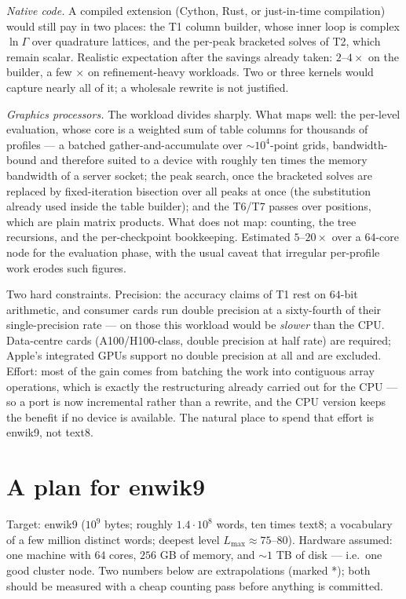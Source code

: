 \documentclass[11pt]{article}
\begin{document}
\emph{Native code.}  A compiled extension (Cython, Rust, or
just-in-time compilation) would still pay in two places: the T1
column builder, whose inner loop is complex $\ln\Gamma$ over
quadrature lattices, and the per-peak bracketed solves of T2, which
remain scalar.  Realistic expectation after the savings already
taken: $2$--$4\times$ on the builder, a few $\times$ on
refinement-heavy workloads.  Two or three kernels would capture
nearly all of it; a wholesale rewrite is not justified.

\emph{Graphics processors.}  The workload divides sharply.  What
maps well: the per-level evaluation, whose core is a weighted sum of
table columns for thousands of profiles --- a batched
gather-and-accumulate over $\sim\!10^4$-point grids, bandwidth-bound
and therefore suited to a device with roughly ten times the memory
bandwidth of a server socket; the peak search, once the bracketed
solves are replaced by fixed-iteration bisection over all peaks at
once (the substitution already used inside the table builder); and
the T6/T7 passes over positions, which are plain matrix products.
What does not map: counting, the tree recursions, and the
per-checkpoint bookkeeping.  Estimated $5$--$20\times$ over a
$64$-core node for the evaluation phase, with the usual caveat that
irregular per-profile work erodes such figures.

Two hard constraints.  Precision: the accuracy claims of T1 rest on
$64$-bit arithmetic, and consumer cards run double precision at a
sixty-fourth of their single-precision rate --- on those this
workload would be \emph{slower} than the CPU.  Data-centre cards
(A100/H100-class, double precision at half rate) are required;
Apple's integrated GPUs support no double precision at all and are
excluded.  Effort: most of the gain comes from batching the work
into contiguous array operations, which is exactly the restructuring
already carried out for the CPU --- so a port is now incremental
rather than a rewrite, and the CPU version keeps the benefit if no
device is available.  The natural place to spend that effort is
enwik9, not text8.

\section*{A plan for enwik9}

Target: enwik9 ($10^9$ bytes; roughly $1.4\cdot 10^8$ words, ten
times text8; a vocabulary of a few million distinct words; deepest
level $L_{\max} \approx 75$--$80$).  Hardware assumed: one machine
with $64$ cores, $256$ GB of memory, and $\sim 1$ TB of disk ---
i.e.\ one good cluster node.  Two numbers below are extrapolations
(marked *); both should be measured with a cheap counting pass
before anything is committed.
\end{document}
